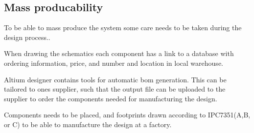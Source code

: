 \subsection{Mass producability}
To be able to mass produce the system some care needs to be taken during the design process..

When drawing the schematics each component has a link to a database with ordering information, price, and number and location in local warehouse.

Altium designer contains tools for automatic bom generation. This can be tailored to ones supplier, such that the output file can be uploaded to the supplier to order the components needed for manufacturing the design.



Components needs to be placed, and footprints drawn according to IPC7351(A,B, or C) to be able to manufacture the design at a factory.



